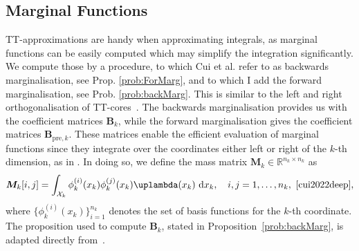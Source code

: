 \subsection{Marginal Functions}
TT-approximations are handy when approximating integrals, as marginal functions can be easily computed which may simplify the integration significantly.
We compute those by a procedure, to which Cui et al. \cite{cui2022deep} refer to as backwards marginalisation, see Prop. \ref{prob:ForMarg}, and to which I add the forward marginalisation, see Prob. \ref{prob:backMarg}. 
This is similar to the left and right orthogonalisation of TT-cores~\cite{oseledets2011tensor, Oseledets2011DMRG}.
The backwards marginalisation provides us with the coefficient matrices $\bm{B}_k$, while the forward marginalisation gives the coefficient matrices $\bm{B}_{\text{pre}, k}$. 
These matrices enable the efficient evaluation of marginal functions since they integrate over the coordinates either left or right of the $k$-th dimension, as in \cite{cui2022deep}.
In doing so, we define the mass matrix $\bm{M}_k \in \mathbb{R}^{n_k \times n_k}$ as
\begin{equation}
	\bm{M}_k[i, j] = \int_{\mathcal{X}_k} \phi^{(i)}_k(x_k) \phi^{(j)}_k(x_k) \uplambda(x_k) \, \diff x_k, \quad i, j = 1, \dots, n_k, \, \,  \text{\cite[Eq. 22]{cui2022deep}},
\end{equation}
where $\{\phi^{(i)}_k(x_k)\}_{i=1}^{n_k}$ denotes the set of basis functions for the $k$-th coordinate.
The proposition used to compute $\bm{B}_k$, stated in Proposition~\ref{prob:backMarg}, is adapted directly from~\cite{cui2022deep}.

